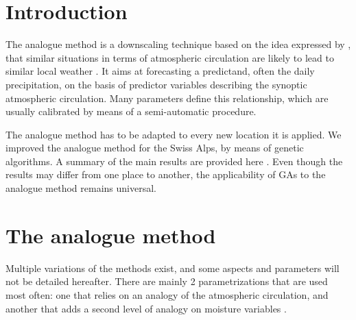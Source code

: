 \documentclass[twocol]{ametsoc}
\begin{document}


\section{Introduction}
\label{section_intro}

The analogue method is a downscaling technique based on the idea expressed by \citet{Lorenz1969}, that similar situations in terms of atmospheric circulation are likely to lead to similar local weather \citep{Bontron2005}. It aims at forecasting a predictand, often the daily precipitation, on the basis of predictor variables describing the synoptic atmospheric circulation. Many parameters define this relationship, which are usually calibrated by means of a semi-automatic procedure.

The analogue method has to be adapted to every new location it is applied. We improved the analogue method for the Swiss Alps, by means of genetic algorithms. A summary of the main results are provided here \citep[see][for the details]{Horton2012a}. Even though the results may differ from one place to another, the applicability of GAs to the analogue method remains universal.



\section{The analogue method}
\label{section_analog_method}

Multiple variations of the methods exist, and some aspects and parameters will not be detailed hereafter. There are mainly 2 parametrizations that are used most often: one that relies on an analogy of the atmospheric circulation, and another that adds a second level of analogy on moisture variables \citep{Obled2002, Bontron2005, Marty2012}.
\end{document}
